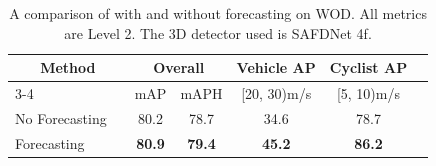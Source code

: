 \begin{table}[t]
    \centering
    \footnotesize
    \begin{tabular}{@{}llccccc@{}}
        \toprule
        \multicolumn{2}{c}{Method}    & \multicolumn{2}{c}{Overall}   & \multicolumn{1}{c}{Vehicle AP}  & \multicolumn{1}{c}{Cyclist AP}       \\ 
         \cmidrule(lr){3-4}
                          &                  & mAP  & mAPH & [20, 30)m/s & [5, 10)m/s \\ 
        \midrule
        No Forecasting    &                  & 80.2 & 78.7 & 34.6 & 78.7 \\
        Forecasting       &                  & \textbf{80.9} & \textbf{79.4} & \textbf{45.2} & \textbf{86.2} \\ 
        \bottomrule
    \end{tabular}
    \caption{A comparison of \ourmodel{} with and without forecasting on WOD.
    All metrics are Level 2. The 3D detector used is SAFDNet 4f.}
    \label{tab:forecasting-comparison}
\end{table}